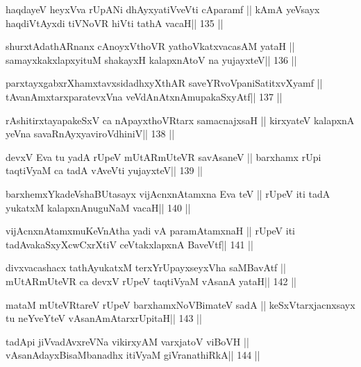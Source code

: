 \begin{shl}
haqdayeV heyxVva rUpANi dhAyxyatiVveVti cAparamf ||
kAmA yeV\s sayx haqdiVtAyxdi tiVNoVR hiVti tathA vacaH\hfill || 135 ||
\end{shl}

\begin{shl}
shurxtAdathARnanx cAnoyxV\s thoVR yathoVkatxvacasAM yataH ||
samayxkakxlapxyituM shakayxH kalapxnA\s toV na yujayxteV\hfill || 136 ||
\end{shl}

\begin{shl}
parxtayxgabxrXhamxtavxsidadhxyXthAR saveYRvoVpaniSatitxvXyamf ||
tAvanAmxtarxparatevxVna veVdAnAtxnAmupakaSxyAtf\hfill || 137 ||
\end{shl}

\begin{shl}
rAshitirxtayapakeSxV ca nApayxthoVR\s tarx samacnajxsaH ||
kirxyateV kalapxnA yeVna savaRnAyxyaviroVdhiniV\hfill || 138 ||
\end{shl}

\begin{shl}
devxV Eva tu yadA rUpeV mUtARmUteVR savAsaneV ||
barxhamx rUpi taqtiVyaM ca tadA vAveVti yujayxteV\hfill || 139 ||
\end{shl}

\begin{shl}
barxhemxYkadeVshaBUtasayx vijAcnxnAtamxna Eva teV ||
rUpeV iti tadA yukatxM kalapxnAnuguNaM vacaH\hfill || 140 ||
\end{shl}

\begin{shl}
vijAcnxnAtamxmuKeVnAtha yadi vA paramAtamxnaH ||
rUpeV iti tadA\s vakaSxyXcwCxrXtiV ceVtakxlapxnA BaveVtf\hfill || 141 ||
\end{shl}

\begin{shl}
divxvacashacx tathA\s yukatxM terxYrUpayxseyxVha saMBavAtf ||
mUtARmUteVR ca devxV rUpeV taqtiVyaM vAsanA yataH\hfill || 142 ||
\end{shl}

\begin{shl}
mataM mUteVRtareV rUpeV barxhamxNoV\s BimateV sadA ||
keSxVtarxjacnxsayx tu neYveYteV vAsanAmAtarxrUpitaH\hfill || 143 ||
\end{shl}

\begin{shl}
tadA\s pi jiVvadAvxreVNa vikirxyAM varxjatoV viBoVH ||
vAsanAdayxBisaMbanadhx itiVyaM giVranathiRkA\hfill || 144 ||
\end{shl}

